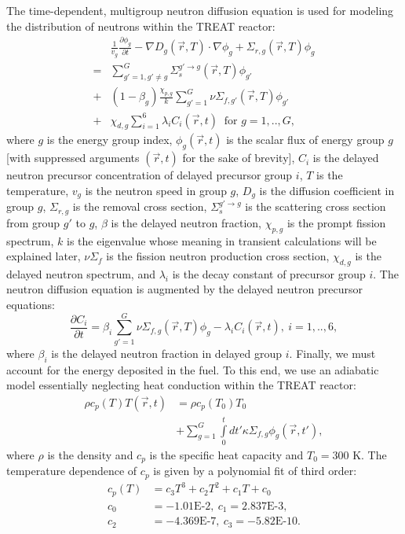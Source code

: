 \documentclass{anstrans}
\begin{document}
The time-dependent, multigroup neutron diffusion equation is used for modeling the distribution of neutrons within the TREAT reactor:
\begin{align}\label{eq:neutron_diffusion}
   &\frac{1}{v_g} \frac{\partial \phi_g}{\partial t} -\nabla D_g(\vec{r},T) \cdot \nabla \phi_g + \Sigma_{r,g}(\vec{r}, T) \phi_g \nonumber \\
   = &\sum\limits_{g'=1, g' \neq g}^G \Sigma_s^{g' \rightarrow g} (\vec{r},T) \phi_{g'}  \nonumber \\
   +&(1 - \beta_g) \frac{\chi_{p,g}}{k}\sum\limits_{g'=1}^G \nu \Sigma_{f,g'} (\vec{r},T) \phi_{g'} \nonumber \\
+& \chi_{d,g }\sum\limits_{i=1}^6  \lambda_i C_i(\vec{r}, t)~\text{ for }g=1,..,G,
\end{align}
where $g$ is the energy group index, $\phi_g(\vec{r}, t)$ is the scalar flux of energy group $g$ [with suppressed arguments $(\vec{r}, t)$ for the sake of brevity], $C_i$ is the delayed neutron precursor concentration of delayed precursor group $i$, $T$ is the temperature, $v_g$ is the neutron speed in group $g$, $D_g$ is the diffusion coefficient in group $g$, $\Sigma_{r,g}$ is the removal cross section, $\Sigma_s^{g'\rightarrow g}$ is the scattering cross section from group $g'$ to $g$, $\beta$ is the delayed neutron fraction, $\chi_{p,g}$ is the prompt fission spectrum, $k$ is the eigenvalue whose meaning in transient calculations will be explained later, $\nu \Sigma_f$  is the fission neutron production cross section, $\chi_{d,g}$ is the delayed neutron spectrum, and $\lambda_i$ is the decay constant of precursor group $i$. The neutron diffusion equation  is augmented by the delayed neutron precursor equations:
\begin{equation}\label{eq:delayed_precursors}
   \frac{\partial C_i }{\partial t} = \beta_i \sum\limits_{g'=1}^G \nu \Sigma_{f,g} (\vec{r},T) \phi_{g} - \lambda_i C_i(\vec{r},t),~i=1,..,6,
\end{equation}
where $\beta_i$ is the delayed neutron fraction in delayed group $i$. Finally, we must account for the energy deposited in the fuel. To this end, we use an adiabatic model essentially neglecting heat conduction within the TREAT reactor:
\begin{align}\label{eq:heat_conduction}
  \rho c_p(T)T(\vec{r},t) & =  \rho c_p(T_0) T_0 \nonumber \\
                           &+ \sum\limits_{g=1}^G  \int\limits_0^t d t'  \kappa \Sigma_{f,g} \phi_g(\vec{r}, t'),
\end{align}
where $\rho$ is the density and $c_p$ is the specific heat capacity and $T_0 = 300$ K. The temperature dependence of $c_p$ is given by a polynomial fit of third order:
\begin{align}\label{eq:heat_conduction_empirical}
  c_p(T) &= c_3 T^3 + c_2 T^2 + c_1 T + c_0 \nonumber \\
  c_0 &=-1.01\text{E-2} ,~c_1 =2.837\text{E-3},\nonumber \\
  c_2 &= - 4.369\text{E-7},~c_3 =-5.82\text{E-10}.
\end{align}
\end{document}
